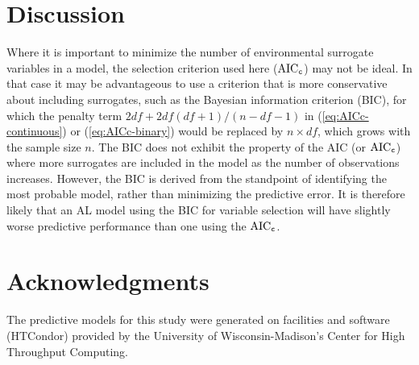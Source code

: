 \documentclass[authoryear,review, 12pt]{elsarticle}
\begin{document}
\section{Discussion}

Where it is important to minimize the number of environmental surrogate variables in a model, the selection
criterion used here (\(\text{AIC}_{\tt c}\)) may not be ideal. In that
case it may be advantageous to use a criterion that is more conservative
about including surrogates, such as the Bayesian
information criterion (BIC), for which the penalty term
\(2df + 2df(df+1)/(n-df-1)\) in (\ref{eq:AICc-continuous}) or
(\ref{eq:AICc-binary}) would be replaced by \(n \times df\), which grows
with the sample size \(n\). The BIC does not exhibit the property of the
AIC (or \(\text{AIC}_{\tt c}\)) where more surrogates are included in
the model as the number of observations increases. However, the BIC is
derived from the standpoint of identifying the most probable model,
rather than minimizing the predictive error. It is therefore likely that
an AL model using the BIC for variable selection will have slightly
worse predictive performance than one using the \(\text{AIC}_{\tt c}\).

\section{Acknowledgments}\label{acknowledgments}

The predictive models for this study were generated on facilities and
software (HTCondor) provided by the University of Wisconsin-Madison's
Center for High Throughput Computing.
\end{document}
